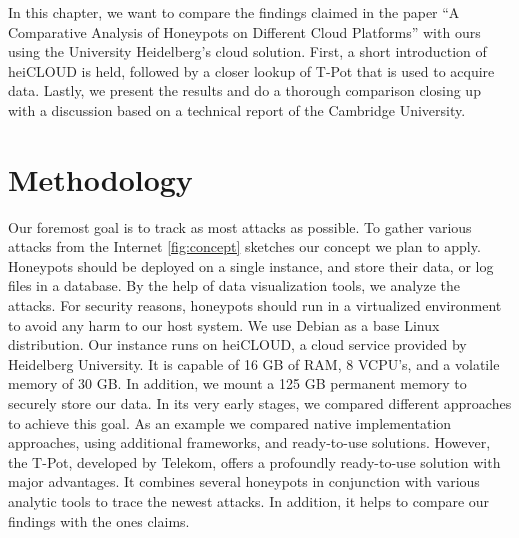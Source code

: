 In this chapter, we want to compare the findings \citet{Kelly2021} claimed in the paper \enquote{A Comparative Analysis of Honeypots on Different
    Cloud Platforms} with ours using the University Heidelberg's cloud solution.
First, a short introduction of heiCLOUD is held, followed by a closer lookup of T-Pot that is used to acquire data.
Lastly, we present the results and do a thorough comparison closing up with a discussion based on a technical report of the Cambridge University.

\section{Methodology}

Our foremost goal is to track as most attacks as possible.
To gather various attacks from the Internet \autoref{fig:concept} sketches our concept we plan to apply.
Honeypots should be deployed on a single instance, and store their data, or log files in a database.
By the help of data visualization tools, we analyze the attacks.
For security reasons, honeypots should run in a virtualized environment to avoid any harm to our host system.
We use Debian as a base Linux distribution.
Our instance runs on heiCLOUD, a cloud service provided by Heidelberg University.
It is capable of 16 GB of RAM, 8 VCPU's, and a volatile memory of 30 GB.
In addition, we mount a 125 GB permanent memory to securely store our data.
In its very early stages, we compared different approaches to achieve this goal.
As an example we compared native implementation approaches, using additional frameworks, and ready-to-use solutions.
However, the T-Pot, developed by Telekom, offers a profoundly ready-to-use solution with major advantages.
It combines several honeypots in conjunction with various analytic tools to trace the newest attacks.
In addition, it helps to compare our findings with the ones \citet{Kelly2021} claims.

